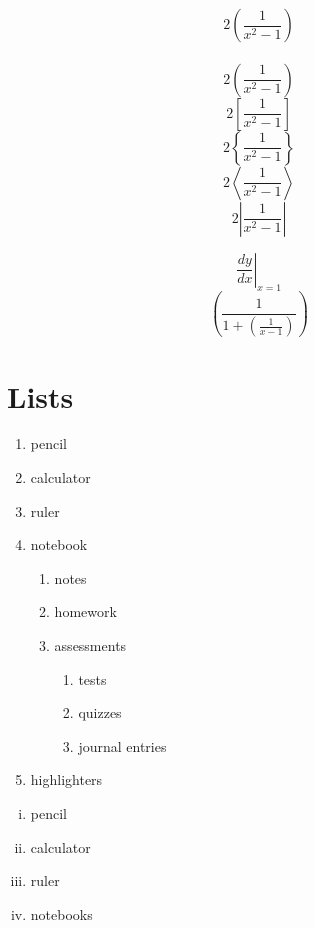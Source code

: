 \documentclass[12pt, a4paper]{article}
\begin{document}
$$2(\frac{1}{x^2-1})$$ \\
$$2\left(\frac{1}{x^2-1}\right)$$
$$2\left[\frac{1}{x^2-1}\right]$$
$$2\left\{\frac{1}{x^2-1}\right\}$$
$$2\left\langle \frac{1}{x^2-1} \right\rangle$$
$$2\left| \frac{1}{x^2-1} \right|$$

$$\left.\frac{dy}{dx}\right|_{x=1}$$
$$\left( \frac{1}{1+\left(\frac{1}{x-1}\right)} \right)$$

\section{Lists}

\begin{enumerate}
    \item pencil
    \item calculator
    \item ruler
    \item notebook
        \begin{enumerate}
            \item notes
            \item homework
            \item assessments
            \begin{enumerate}
                \item tests
                \item quizzes
                \item journal entries
            \end{enumerate}
        \end{enumerate}
    \item highlighters
\end{enumerate}

\vspace{0.5cm}

\begin{enumerate}[i.]
    \item pencil
    \item calculator
    \item ruler
    \item notebooks
\end{enumerate}

\vspace{1cm}
\end{document}
